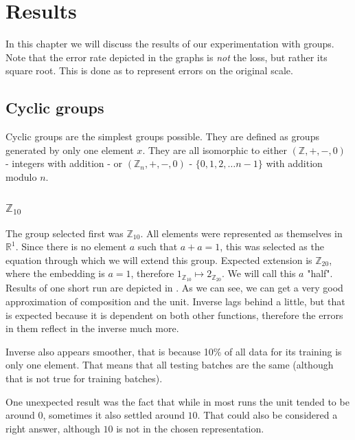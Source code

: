 \chapter{Results}
\label{chapter:results}
In this chapter we will discuss the results of our experimentation with groups. Note that the error rate depicted in the graphs is \textit{not} the loss, but rather its square root. This is done as to represent errors on the original scale.

\section{Cyclic groups}
Cyclic groups are the simplest groups possible. They are defined as groups generated by only one element $x$. They are all isomorphic to either $(\mathbb{Z},+,-,0)$ - integers with addition - or $(\mathbb{Z}_n,+,-,0)$ - $\{0,1,2,\dots n-1\}$ with addition modulo $n$.

\subsection{$\mathbb{Z}_{10}$}

The group selected first was $\mathbb{Z}_{10}$. All elements were represented as themselves in $\mathbb{R}^1$. Since there is no element $a$ such that $a+a=1$, this was selected as the equation through which we will extend this group. Expected extension is $\mathbb{Z}_{20}$, where the embedding is $a = 1$, therefore $1_{\mathbb{Z}_{10}}\mapsto 2_{\mathbb{Z}_{20}}$. We will call this $a$ "half".\\

Results of one short run are depicted in . As we can see, we can get a very good approximation of composition and the unit. Inverse lags behind a little, but that is expected because it is dependent on both other functions, therefore the errors in them reflect in the inverse much more. 

Inverse also appears smoother, that is because 10\% of all data for its training is only one element. That means that all testing batches are the same (although that is not true for training batches).

One unexpected result was the fact that while in most runs the unit tended to be around $0$, sometimes it also settled around $10$. That could also be considered a right answer, although $10$ is not in the chosen representation.\\

